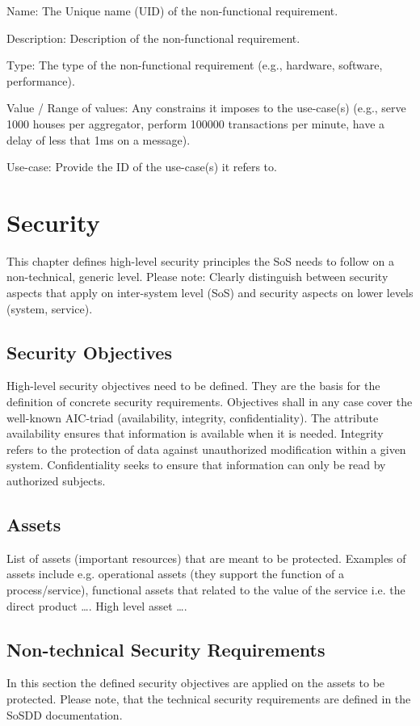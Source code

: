 \documentclass{article}
\begin{document}
Name: The Unique name (UID) of the non-functional requirement.

Description: Description of the non-functional requirement.

Type: The type of the non-functional requirement (e.g., hardware, software, performance).

Value / Range of values: Any constrains it imposes to the use-case(s) (e.g., serve 1000 houses per aggregator, perform 100000 transactions per minute, have a delay of less that 1ms on a message).

Use-case: Provide the ID of the use-case(s) it refers to.

\section[Security ]{Security }
This chapter defines high-level security principles the SoS needs to follow on a non-technical, generic level. Please note: Clearly distinguish between security aspects that apply on inter-system level (SoS) and security aspects on lower levels (system, service).

\subsection{Security Objectives}
High-level security objectives need to be defined. They are the basis for the definition of concrete security requirements. Objectives shall in any case cover the well-known AIC-triad (availability, integrity, confidentiality). The attribute availability ensures that information is available when it is needed. Integrity refers to the protection of data against unauthorized modification within a given system. Confidentiality seeks to ensure that information can only be read by authorized subjects. 

\subsection{Assets}
List of assets (important resources) that are meant to be protected. Examples of assets include e.g. operational assets (they support the function of a process/service), functional assets that related to the value of the service i.e. the direct product {\dots}. High level asset {\dots}.

\subsection{Non-technical Security Requirements}
In this section the defined security objectives are applied on the assets to be protected. Please note, that the technical security requirements are defined in the SoSDD documentation.  
\end{document}
